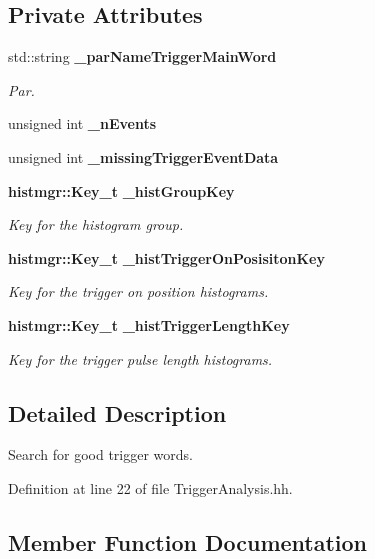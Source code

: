 \subsection*{Private Attributes}
\begin{DoxyCompactItemize}
\item 
std\-::string {\bf \-\_\-par\-Name\-Trigger\-Main\-Word}
\begin{DoxyCompactList}\small\item\em Par. \end{DoxyCompactList}\item 
unsigned int {\bfseries \-\_\-n\-Events}\label{classCALICE_1_1TriggerAnalysis_ad08524b6d02fb2d7b75b172652b1d435}

\item 
unsigned int {\bfseries \-\_\-missing\-Trigger\-Event\-Data}\label{classCALICE_1_1TriggerAnalysis_aee5bbae4a0166c2432de8eaa16fa6dca}

\item 
{\bf histmgr\-::\-Key\-\_\-t} {\bf \-\_\-hist\-Group\-Key}
\begin{DoxyCompactList}\small\item\em Key for the histogram group. \end{DoxyCompactList}\item 
{\bf histmgr\-::\-Key\-\_\-t} {\bf \-\_\-hist\-Trigger\-On\-Posisiton\-Key}
\begin{DoxyCompactList}\small\item\em Key for the trigger on position histograms. \end{DoxyCompactList}\item 
{\bf histmgr\-::\-Key\-\_\-t} {\bf \-\_\-hist\-Trigger\-Length\-Key}
\begin{DoxyCompactList}\small\item\em Key for the trigger pulse length histograms. \end{DoxyCompactList}\end{DoxyCompactItemize}


\subsection{Detailed Description}
Search for good trigger words. 

Definition at line 22 of file Trigger\-Analysis.\-hh.



\subsection{Member Function Documentation}
